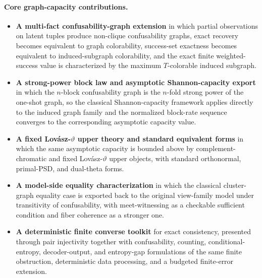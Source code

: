 \paragraph{Core graph-capacity contributions.}
\begin{itemize}
\tightlist
\item \textbf{A multi-fact confusability-graph extension} in which partial observations on latent tuples produce non-clique confusability graphs, exact recovery becomes equivalent to graph colorability, success-set exactness becomes equivalent to induced-subgraph colorability, and the exact finite weighted-success value is characterized by the maximum $T$-colorable induced subgraph.
\item \textbf{A strong-power block law and asymptotic Shannon-capacity export} in which the $n$-block confusability graph is the $n$-fold strong power of the one-shot graph, so the classical Shannon-capacity framework applies directly to the induced graph family and the normalized block-rate sequence converges to the corresponding asymptotic capacity value.
\item \textbf{A fixed Lov\'asz-$\vartheta$ upper theory and standard equivalent forms} in which the same asymptotic capacity is bounded above by complement-chromatic and fixed Lov\'asz-$\vartheta$ upper objects, with standard orthonormal, primal-PSD, and dual-theta forms.
\item \textbf{A model-side equality characterization} in which the classical cluster-graph equality case is exported back to the original view-family model under transitivity of confusability, with meet-witnessing as a checkable sufficient condition and fiber coherence as a stronger one.
\item \textbf{A deterministic finite converse toolkit} for exact consistency, presented through pair injectivity together with confusability, counting, conditional-entropy, decoder-output, and entropy-gap formulations of the same finite obstruction, deterministic data processing, and a budgeted finite-error extension.
\end{itemize}

